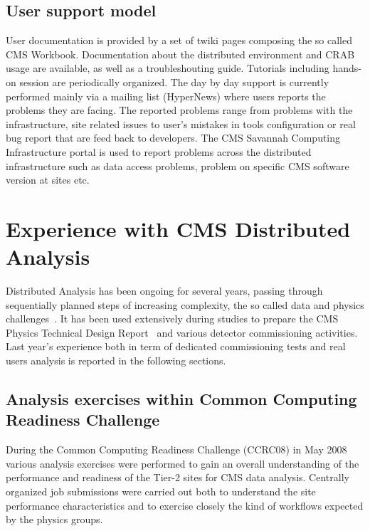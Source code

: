 \subsection{User support model}
\label{sec:4_4}
User documentation is provided by a set of twiki pages composing the so called CMS Workbook. Documentation about the distributed environment and CRAB usage are available, as well as a troubleshouting guide.
Tutorials including hands-on session are periodically organized.
The day by day support is currently performed mainly via a mailing list (HyperNews) where users reports the problems they are facing. The reported problems range from problems with the infrastructure, 
site related issues to user's mistakes in tools configuration or real bug report that are feed back to developers.
The CMS Savannah Computing Infrastructure portal is used to report problems across the distributed infrastructure such as data access problems, problem on specific CMS software version at sites etc.

\section{Experience with CMS Distributed Analysis}
\label{sec:5}

Distributed Analysis has been ongoing for several years, passing through sequentially planned steps of 
increasing complexity, the so called data and physics challenges~\cite{RefPastExp}. 
It has been used extensively during studies to prepare the CMS Physics Technical Design Report~\cite{PTDR} and various detector commissioning activities. 
Last year's experience both in term of dedicated commissioning tests and real users analysis is reported in the following sections.

\subsection{Analysis exercises within Common Computing Readiness Challenge}
\label{sec:5_1}
During the Common Computing Readiness Challenge (CCRC08) in May 2008
various analysis exercises were performed to gain an overall understanding 
of the performance and readiness of the Tier-2 sites for CMS data analysis.
Centrally organized job submissions were carried out both to understand the site performance characteristics and to exercise closely the kind of workflows
expected by the physics groups.
